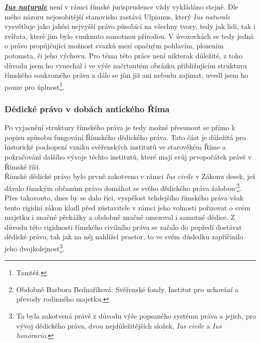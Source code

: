\documentclass{article}
\begin{document}
\underline{\textbf{\textit{Ius naturale}}} není v rámci římské jurisprudence vždy vykládáno stejně. Dle mého názoru nejosobitější stanovisko zastává Ulpianus, který \textit{Ius naturale} vysvětluje jako jakési nejvyšší právo působící na všechny tvory, tedy jak lidi, tak i zvířata, které jim bylo vnuknuto samotnou přírodou. V úvozovkách se tedy jedná o právo propůjčující možnost svazků mezi opačným pohlavím, plozením potomsta, či jeho výchovu. Pro téma této práce není nikterak důležité, z toho důvodu jsem ho vynechal i ve výše načrtnutém obrázku přibližujícím strukturu římského soukromého práva a dále se jím již ani nebudu zajímat, uvedl jsem ho pouze pro úplnost\footnote{Tamtéž.}.\\


\subsubsection{Dědické právo v dobách antického Říma}

Po vyjasnění struktury římského práva je tedy možné přesunout se přímo k popisu způsobu fungování Římského dědického práva. Tato část je důležitá pro historické pochopení vzniku svěřenských institutů ve starověkém Říme a pokračování dalšího vývoje těchto institutů, které mají svůj prvopočátek právě v Římské říši. \\


Římské dědické právo bylo prvně zakotveno v rámci \textit{Ius civile} v Zákonu \MakeUppercase{} desek, jež dávalo římským občanům právo domáhat se svého dědického práva žalobou\textsuperscript{,}\footnote{Obdobně Barbora Bednaříková: Svěřenské fondy. Institut pro uchování a převody rodinného majetku.}. Přes takovouto, dnes by se dalo říci, vyspělost tehdejšího římského práva však tento rigidní zákon kladl před zůstavitele v rámci jeho volnosti pořizovat o svém majetku i značné překážky a obdobně značně omezoval i samotné dědice. Z důvodu této rigidnosti římského civilního práva se začalo do popředí dostávat dědické právo, tak jak na něj nahlížel praetor, to ve svém důsledku zapříčinilo jeho dvojkolejnost\footnote{Ta byla zakotvená právě z důvodu výše popsaného systému práva a jejich, pro vývoj dědického práva, dvou nejdůležitějších složek, \textit{Ius civile} a \textit{Ius honorario}.}.\\
\end{document}
